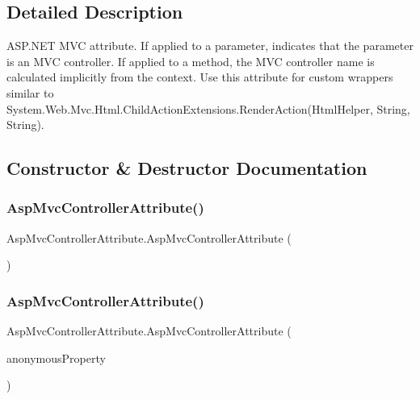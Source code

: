 \subsection{Detailed Description}
A\+S\+P.\+N\+ET M\+VC attribute. If applied to a parameter, indicates that the parameter is an M\+VC controller. If applied to a method, the M\+VC controller name is calculated implicitly from the context. Use this attribute for custom wrappers similar to {\ttfamily System.\+Web.\+Mvc.\+Html.\+Child\+Action\+Extensions.\+Render\+Action(\+Html\+Helper, String, String)}. 



\subsection{Constructor \& Destructor Documentation}
\mbox{\label{class_asp_mvc_controller_attribute_ae20327545a89d7ad0f17c76fd0bdcb0f}} 
\subsubsection{\texorpdfstring{Asp\+Mvc\+Controller\+Attribute()}{AspMvcControllerAttribute()}\hspace{0.1cm}{\footnotesize\ttfamily [1/2]}}
{\footnotesize\ttfamily Asp\+Mvc\+Controller\+Attribute.\+Asp\+Mvc\+Controller\+Attribute (\begin{DoxyParamCaption}{ }\end{DoxyParamCaption})}

\mbox{\label{class_asp_mvc_controller_attribute_ae05b815dd8d8729a85430d575344a2c1}} 
\subsubsection{\texorpdfstring{Asp\+Mvc\+Controller\+Attribute()}{AspMvcControllerAttribute()}\hspace{0.1cm}{\footnotesize\ttfamily [2/2]}}
{\footnotesize\ttfamily Asp\+Mvc\+Controller\+Attribute.\+Asp\+Mvc\+Controller\+Attribute (\begin{DoxyParamCaption}\item[{\mbox{[}\+Not\+Null\mbox{]} string}]{anonymous\+Property }\end{DoxyParamCaption})}



